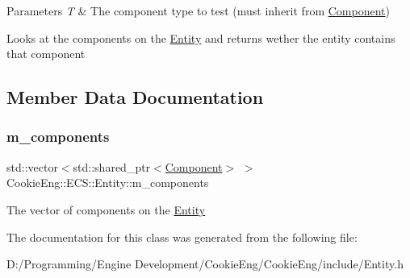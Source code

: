 \begin{DoxyParams}{Parameters}
{\em T} & The component type to test (must inherit from \hyperlink{class_cookie_eng_1_1_e_c_s_1_1_component}{Component})\\
\hline
\end{DoxyParams}
Looks at the components on the \hyperlink{class_cookie_eng_1_1_e_c_s_1_1_entity}{Entity} and returns wether the entity contains that component 

\subsection{Member Data Documentation}
\mbox{\label{class_cookie_eng_1_1_e_c_s_1_1_entity_a5c8b8b6f07c07b97e898ece5dab38517}} 
\subsubsection{\texorpdfstring{m\+\_\+components}{m\_components}}
{\footnotesize\ttfamily std\+::vector$<$std\+::shared\+\_\+ptr$<$\hyperlink{class_cookie_eng_1_1_e_c_s_1_1_component}{Component}$>$ $>$ Cookie\+Eng\+::\+E\+C\+S\+::\+Entity\+::m\+\_\+components\hspace{0.3cm}{\ttfamily [protected]}}

The vector of components on the \hyperlink{class_cookie_eng_1_1_e_c_s_1_1_entity}{Entity} 

The documentation for this class was generated from the following file\+:\begin{DoxyCompactItemize}
\item 
D\+:/\+Programming/\+Engine Development/\+Cookie\+Eng/\+Cookie\+Eng/include/Entity.\+h\end{DoxyCompactItemize}
